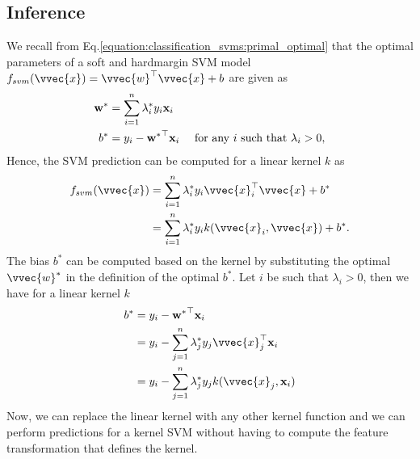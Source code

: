 \documentclass[letterpaper,10pt,english]{jupyterBook}
\begin{document}
\subsection{Inference}
\label{\detokenize{classification_kernel_svm:inference}}
\sphinxAtStartPar
We recall from Eq.\eqref{equation:classification_svms:primal_optimal} that the optimal parameters of a soft\sphinxhyphen{} and hard\sphinxhyphen{}margin SVM model \(f_{svm}(\vvec{x})=\vvec{w}^\top\vvec{x} +b\) are given as
\begin{align*}
{\bf w}^{\ast} &= \sum_{i=1}^{n} \lambda_{i}^{\ast} y_{i} {\bf x}_{i}\\
b^{\ast} &= y_{i} - {{\bf w}^{\ast}}^\top {\bf x}_{i}  \quad\text{ for any }i\text{ such that } \lambda_{i} > 0 ,
\end{align*}
\sphinxAtStartPar
Hence, the SVM prediction can be computed for a linear kernel \(k\) as
\begin{align*}
f_{svm}(\vvec{x})& =\sum_{i=1}^{n} \lambda_i^* y_i \vvec{x}_i^\top\vvec{x} +b^*\\
&= \sum_{i=1}^n \lambda_i^* y_i k(\vvec{x}_i,\vvec{x}) +b^*.
\end{align*}
\sphinxAtStartPar
The bias \(b^*\) can be computed based on the kernel by substituting the optimal \(\vvec{w}^*\) in the definition of the optimal \(b^*\). Let \(i\) be such that \(\lambda_i>0\), then we have for a linear kernel \(k\)
\begin{align*}
b^{\ast} &= y_{i} - {{\bf w}^{\ast}}^\top {\bf x}_{i} \\
&= y_{i} - \sum_{j=1}^{n} \lambda_j^* y_j \vvec{x}_j^\top {\bf x}_{i}\\
&= y_{i} - \sum_{j=1}^{n} \lambda_j^* y_j k(\vvec{x}_j, {\bf x}_{i})
\end{align*}
\sphinxAtStartPar
Now, we can replace the linear kernel with any other kernel function and we can perform predictions for a kernel SVM without having to compute the feature transformation that defines the kernel.
\label{classification_kernel_svm:definition-1}
\end{document}
